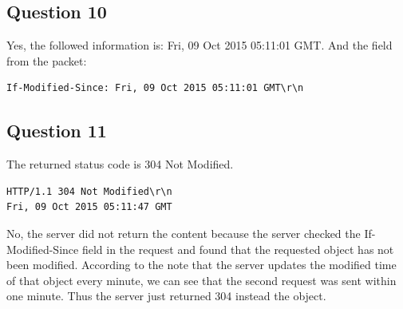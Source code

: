 \documentclass[titlepage, paper=a4, fontsize=11pt]{scrartcl} %
\numberwithin{equation}{section} %
\numberwithin{figure}{section} %
\numberwithin{table}{section} %
\begin{document}
\subsection*{Question 10}
Yes, the followed information is: Fri, 09 Oct 2015 05:11:01 GMT.
And the field from the packet:
\begin{verbatim}
If-Modified-Since: Fri, 09 Oct 2015 05:11:01 GMT\r\n
\end{verbatim}


\subsection*{Question 11}
The returned status code is 304 Not Modified.
\begin{verbatim}
HTTP/1.1 304 Not Modified\r\n
Fri, 09 Oct 2015 05:11:47 GMT
\end{verbatim}
No, the server did not return the content because the server checked the
If-Modified-Since field in the request and found that the requested object
has not been modified. According to the note that the server updates the
modified time of that object every minute, we can see that the second request
was sent within one minute. Thus the server just returned 304 instead the object.
\end{document}
